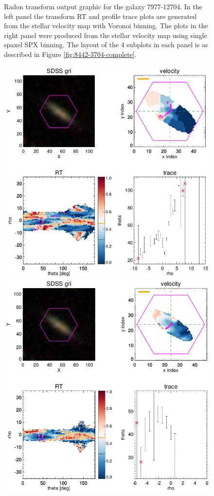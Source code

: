 \begin{figure}
    \caption{Radon transform output graphic for the galaxy 7977-12704. In the left panel the transform RT and profile trace plots are generated from the stellar velocity map with Voronoi binning. The plots in the right panel were produced from the stellar velocity map using single spaxel SPX binning. The layout of the 4 subplots in each panel is as described in Figure \ref{fig:8442-3704-complete}.}
    \label{fig:binning-comparison}
\end{figure}

\begin{figure}
    \centering
    \includegraphics[width=\columnwidth]{images/RadonPlots/RT-SNIPS-NEW/8993-6104-VOR10-MILESHC-MILESHC-1-SNIP.png}
    \includegraphics[width=\columnwidth]{images/RadonPlots/RT-SNIPS-NEW/8993-6104-SPX-MILESHC-MILESHC-1-SNIP.png}

\end{figure}
